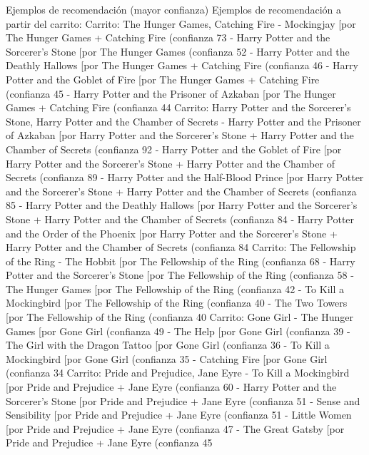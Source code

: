 \documentclass[11pt,letterpaper]{article}
\begin{document}
\begin{consola}[label=out:ejemplos]{Ejemplos de recomendación (mayor confianza)}
Ejemplos de recomendación a partir del carrito:
  Carrito: The Hunger Games, Catching Fire
    - Mockingjay   [por The Hunger Games + Catching Fire (confianza 73%
    - Harry Potter and the Sorcerer's Stone   [por The Hunger Games (confianza 52%
    - Harry Potter and the Deathly Hallows   [por The Hunger Games + Catching Fire (confianza 46%
    - Harry Potter and the Goblet of Fire   [por The Hunger Games + Catching Fire (confianza 45%
    - Harry Potter and the Prisoner of Azkaban   [por The Hunger Games + Catching Fire (confianza 44%
  Carrito: Harry Potter and the Sorcerer's Stone, Harry Potter and the Chamber of Secrets
    - Harry Potter and the Prisoner of Azkaban   [por Harry Potter and the Sorcerer's Stone + Harry Potter and the Chamber of Secrets (confianza 92%
    - Harry Potter and the Goblet of Fire   [por Harry Potter and the Sorcerer's Stone + Harry Potter and the Chamber of Secrets (confianza 89%
    - Harry Potter and the Half-Blood Prince   [por Harry Potter and the Sorcerer's Stone + Harry Potter and the Chamber of Secrets (confianza 85%
    - Harry Potter and the Deathly Hallows   [por Harry Potter and the Sorcerer's Stone + Harry Potter and the Chamber of Secrets (confianza 84%
    - Harry Potter and the Order of the Phoenix   [por Harry Potter and the Sorcerer's Stone + Harry Potter and the Chamber of Secrets (confianza 84%
  Carrito: The Fellowship of the Ring
    - The Hobbit   [por The Fellowship of the Ring (confianza 68%
    - Harry Potter and the Sorcerer's Stone   [por The Fellowship of the Ring (confianza 58%
    - The Hunger Games   [por The Fellowship of the Ring (confianza 42%
    - To Kill a Mockingbird   [por The Fellowship of the Ring (confianza 40%
    - The Two Towers   [por The Fellowship of the Ring (confianza 40%
  Carrito: Gone Girl
    - The Hunger Games   [por Gone Girl (confianza 49%
    - The Help   [por Gone Girl (confianza 39%
    - The Girl with the Dragon Tattoo   [por Gone Girl (confianza 36%
    - To Kill a Mockingbird   [por Gone Girl (confianza 35%
    - Catching Fire   [por Gone Girl (confianza 34%
  Carrito: Pride and Prejudice, Jane Eyre
    - To Kill a Mockingbird   [por Pride and Prejudice + Jane Eyre (confianza 60%
    - Harry Potter and the Sorcerer's Stone   [por Pride and Prejudice + Jane Eyre (confianza 51%
    - Sense and Sensibility   [por Pride and Prejudice + Jane Eyre (confianza 51%
    - Little Women   [por Pride and Prejudice + Jane Eyre (confianza 47%
    - The Great Gatsby   [por Pride and Prejudice + Jane Eyre (confianza 45%
\end{consola}
\end{document}

